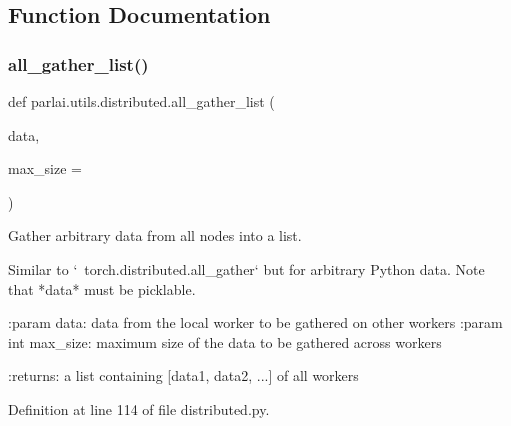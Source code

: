 \subsection{Function Documentation}
\mbox{\label{namespaceparlai_1_1utils_1_1distributed_a9ef5bf0debf512ddbeb045327bfd87ef}} 
\subsubsection{\texorpdfstring{all\+\_\+gather\+\_\+list()}{all\_gather\_list()}}
{\footnotesize\ttfamily def parlai.\+utils.\+distributed.\+all\+\_\+gather\+\_\+list (\begin{DoxyParamCaption}\item[{}]{data,  }\item[{}]{max\+\_\+size = {} }\end{DoxyParamCaption})}

\begin{DoxyVerb}Gather arbitrary data from all nodes into a list.

Similar to `~torch.distributed.all_gather` but for arbitrary Python
data. Note that *data* must be picklable.

:param data:
    data from the local worker to be gathered on other workers
:param int max_size:
    maximum size of the data to be gathered across workers

:returns:
    a list containing [data1, data2, ...] of all workers
\end{DoxyVerb}
 

Definition at line 114 of file distributed.\+py.


